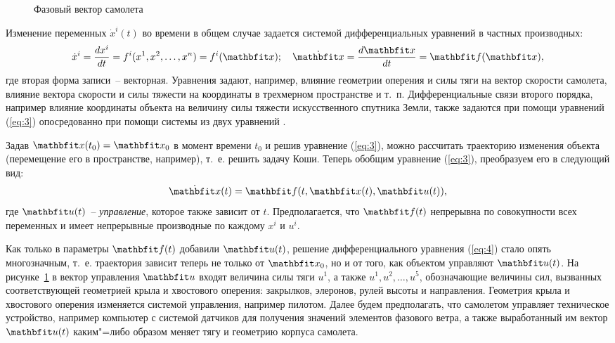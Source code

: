 \documentclass[a4paper,14pt, openany, twoside, draft]{extbook} %
\begin{document}
\begin{figure}[bh]
  \centering
  \footnotesize
      \def\xyz{$x^1,x^2,x^3,\;x^4,x^5,x^6$} \def\yaw{$x^7,x^8$} \def\pitch{$x^9,x^{10}$}
      \def\roll{$\!\!\!\!\!\!x^{11},x^{12}$} \def\lift{$x^{13}$} \def\down{$\!\!x^{14}$}
      \def\thrust{$u^1$} \def\rudder{$u^5$} \def\drag{$x^{15}$}
      \def\flaps{$u^2$} \def\aeleron{$u^3$} \def\engine{}
      \def\elevator{$u^4$} \def\svgwidth{0.80\columnwidth}
      
  \caption{Фазовый вектор самолета}
  \label{fig:phasecoords}
\end{figure}

Изменение переменных $\dot{x}^i(t)$ во времени в общем случае задается системой дифференциальных уравнений в частных производных:
\begin{equation}
  \label{eq:3}
\dot{x}^i=\frac{dx^i}{dt}=f^i(x^1,x^2,\ldots,x^n)=f^i(\vecx);\quad
   \dot{\vecx}=\frac{d\vecx}{dt}=\vecf(\vecx),
\end{equation}
где вторая форма записи~-- векторная. Уравнения задают, например, влияние геометрии оперения и силы тяги на вектор скорости самолета, влияние вектора скорости и силы тяжести на координаты в трехмерном пространстве и т.~п.  Дифференциальные связи второго порядка, например влияние координаты объекта на величину силы тяжести искусственного спутника Земли, также задаются при помощи уравнений (\ref{eq:3}) опосредованно при помощи системы из двух уравнений \cite{pontr}.

Задав $\vecx(t_0)=\vecx_0$ в момент времени $t_0$ и решив уравнение (\ref{eq:3}), можно рассчитать траекторию изменения объекта (перемещение его в пространстве, например), т.~е. решить задачу Коши.  Теперь обобщим уравнение (\ref{eq:3}), преобразуем его в следующий вид:
\begin{equation}
  \label{eq:4}
  \dot{\vecx}(t)=\vecf(t,\vecx(t),\vecu(t)),
\end{equation}
где $\vecu(t)$~-- \emph{управление}, которое также зависит от $t$.  Предполагается, что $\vecf(t)$ непрерывна по совокупности всех переменных и имеет непрерывные производные по каждому $x^i$ и $u^i$.

Как только в параметры $\vecf(t)$ добавили $\vecu(t)$, решение дифференциального уравнения (\ref{eq:4}) стало опять многозначным, т.~е. траектория зависит теперь не только от $\vecx_0$, но и от того, как объектом управляют $\vecu(t)$.  На рисунке~\ref{fig:phasecoords} в вектор управления $\vecu$ входят величина силы тяги $u^1$, а также $u^1,u^2,\ldots,u^5$, обозначающие величины сил, вызванных соответствующей геометрией крыла и хвостового оперения: закрылков, элеронов, рулей высоты и направления.  Геометрия крыла и хвостового оперения изменяется системой управления, например пилотом.  Далее будем предполагать, что самолетом управляет техническое устройство, например компьютер с системой датчиков для получения значений элементов фазового ветра, а также выработанный им вектор $\vecu(t)$ каким"=либо образом меняет тягу и геометрию корпуса самолета.
\end{document}
